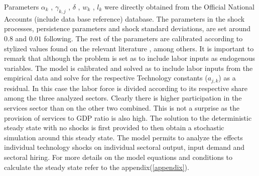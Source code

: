 Parameters $\alpha_{k}$ , $\gamma_{k,j}$ , $\delta$ , $w_{k}$ , $l_{k}$ were directly obtained from the Official National Accounts (include data base reference) database. 
The parameters in the shock processes, persistence parameters and shock standard deviations, are set around $0.8$ and $0.01$ following\cite{kim}.
The rest of the parameters are calibrated according to stylized values found on the relevant literature \cite{sims}, \cite{fisher} among others. 
It is important to remark that although the problem is set as to include labor inputs as endogenous variables. The model is calibrated and solved as to include labor inputs from the empirical data and solve for the respective Technology constants ($a_{j,k}$) as a residual. In this case the labor force is divided according to its respective share among the three analyzed sectors. Clearly there is higher participation in the services sector than on the other two combined. This is not a surprise as the provision of services to GDP ratio is also high.  
The solution to the deterministic steady state with no shocks is first provided to  then obtain a stochastic simulation around this steady state. The model permits to analyze the effects individual technology shocks on individual sectoral output, input demand and sectoral hiring.  
For more details on the model equations and conditions to calculate the steady state refer to the appendix(\ref{appendix}).




 



